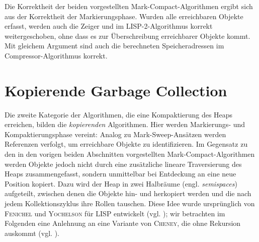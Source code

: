 Die Korrektheit der beiden vorgestellten Mark-Compact-Algorithmen ergibt sich aus der Korrektheit der Markierungsphase.
Wurden alle erreichbaren Objekte erfasst, werden auch die Zeiger  und  im LISP-2-Algorithmus korrekt weitergeschoben, ohne dass es zur Überschreibung erreichbarer Objekte kommt.
Mit gleichem Argument sind auch die berechneten Speicheradressen im Compressor-Algorithmus korrekt.




\section{Kopierende Garbage Collection}
\label{sec:copying}
Die zweite Kategorie der Algorithmen, die eine Kompaktierung des Heaps erreichen, bilden die \textit{kopierenden} Algorithmen.
Hier werden Markierungs- und Kompaktierungsphase vereint:
Analog zu Mark-Sweep-Ansätzen werden Referenzen verfolgt, um erreichbare Objekte zu identifizieren.
Im Gegensatz zu den in den vorigen beiden Abschnitten vorgestellten Mark-Compact-Algorithmen werden Objekte jedoch nicht durch eine zusätzliche lineare Traversierung des Heaps zusammengefasst, sondern unmittelbar bei Entdeckung an eine neue Position kopiert.
Dazu wird der Heap in zwei Halbräume (engl. \textit{semispaces}) aufgeteilt, zwischen denen die Objekte hin- und herkopiert werden und die nach jedem Kollektionszyklus ihre Rollen tauschen.
Diese Idee wurde ursprünglich von \textsc{Fenichel} und \textsc{Yochelson} für LISP entwickelt (vgl. \cite{fenichel1969}); wir betrachten im Folgenden eine Anlehnung an eine Variante von \textsc{Cheney}, die ohne Rekursion auskommt (vgl. \cite{cheney1970}).


